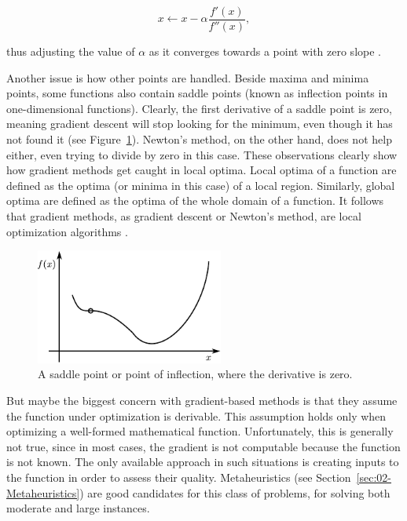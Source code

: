 \begin{equation}
x\leftarrow x-\alpha\frac{f'(x)}{f''(x)},
\end{equation}


\noindent thus adjusting the value of $\alpha$ as it converges towards
a point with zero slope \cite{Luke-Essentials_of_metaheuristics:2009}.

Another issue is how other points are handled. Beside maxima and minima
points, some functions also contain saddle points (known as inflection
points in one-dimensional functions). Clearly, the first derivative
of a saddle point is zero, meaning gradient descent will stop looking
for the minimum, even though it has not found it (see Figure~\ref{fig:02-gradient_descent_saddle_point}).
Newton's method, on the other hand, does not help either, even trying
to divide by zero in this case. These observations clearly show how
gradient methods get caught in local optima. Local optima of a function
are defined as the optima (or minima in this case) of a local region.
Similarly, global optima are defined as the optima of the whole domain
of a function. It follows that gradient methods, as gradient descent
or Newton\textquoteright{}s method, are local optimization algorithms
\cite{Luke-Essentials_of_metaheuristics:2009}.

\begin{figure}
\centering

\includegraphics[width=0.55\textwidth]{02-background_and_motivation/img/gradient_descent_saddle_point}

\caption{A saddle point or point of inflection, where the derivative is zero.
\label{fig:02-gradient_descent_saddle_point}}
\end{figure}


But maybe the biggest concern with gradient-based methods is that
they assume the function under optimization is derivable. This assumption
holds only when optimizing a well-formed mathematical function. Unfortunately,
this is generally not true, since in most cases, the gradient is not
computable because the function is not known. The only available approach
in such situations is creating inputs to the function in order to
assess their quality. Metaheuristics (see Section~\ref{sec:02-Metaheuristics})
are good candidates for this class of problems, for solving both moderate
and large instances.


